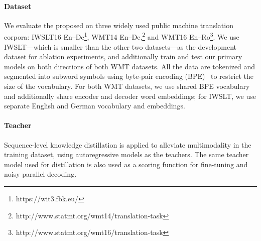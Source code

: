 \documentclass{article} %
\begin{document}
\paragraph{Dataset} We evaluate the proposed \model{} on three widely used public machine translation corpora: IWSLT16 En--De\footnote{https://wit3.fbk.eu/}, WMT14 En--De,\footnote{http://www.statmt.org/wmt14/translation-task} and WMT16 En--Ro\footnote{http://www.statmt.org/wmt16/translation-task}. We use IWSLT---which is smaller than the other two datasets---as the development dataset for ablation experiments, and additionally train and test our primary models on both directions of both WMT datasets.
All the data are tokenized and segmented into subword symbols using byte-pair encoding (BPE)~\citep{sennrich2015neural} to restrict the size of the vocabulary. For both WMT datasets, we use shared BPE vocabulary and additionally share encoder and decoder word embeddings; for IWSLT, we use separate English and German vocabulary and embeddings.
\vspace{-5pt}
\paragraph{Teacher} Sequence-level knowledge distillation is applied to alleviate multimodality in the training dataset, using autoregressive models as the teachers. The same teacher model used for distillation is also used as a scoring function for fine-tuning and noisy parallel decoding.
\end{document}
